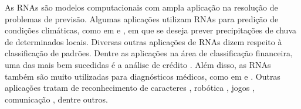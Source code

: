 As RNAs são modelos computacionais com ampla aplicação na resolução de problemas de previsão. Algumas aplicações utilizam RNAs para predição de condições climáticas, como em \cite{ref:apl-clima1} e \cite{ref:apl-clima2}, em que se deseja prever precipitações de chuva de determinados locais. Diversas outras aplicações de RNAs dizem respeito à classificação de padrões. Dentre as aplicações na área de classificação financeira, uma das mais bem sucedidas é a análise de crédito \cite{ref:teresa}. Além disso, as RNAs também são muito utilizadas para diagnósticos médicos, como em \cite{ref:apl-diagnostico1} e \cite{ref:apl-diagnostico2}. Outras aplicações tratam de reconhecimento de caracteres \cite{ref:apl-caracteres}, robótica \cite{ref:apl-robotica}, jogos \cite{ref:apl-jogos}, comunicação \cite{ref:meu-artigo}, dentre outros.